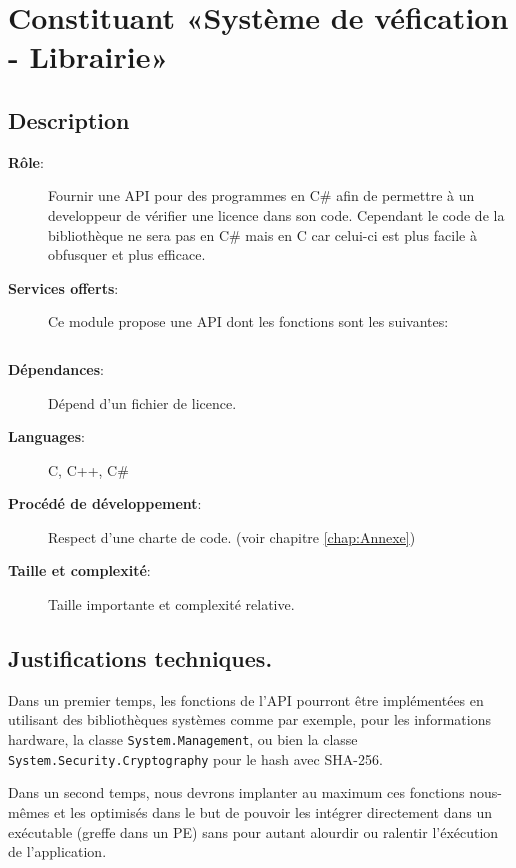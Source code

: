 \section{Constituant «Système de véfication - Librairie»}
\subsection{Description}
\begin{description}
	\item[\textbf{Rôle}:]
		Fournir une API pour des programmes en C\# afin de 
		permettre à un developpeur de vérifier une licence dans son code.
        Cependant le code de la bibliothèque ne sera pas en C\# mais en 
        C car celui-ci est plus facile à obfusquer et plus efficace. 

	\newpage

	\item[\textbf{Services offerts}:]
		Ce module propose une API dont les fonctions sont les suivantes:
        \inputminted{csharp}{lib.cs}
	\item[\textbf{Dépendances}:]
		Dépend d'un fichier de licence.	
	\item[\textbf{Languages}:]
		C, C++, C\#
	\item[\textbf{Procédé de développement}:]
		Respect d'une charte de code. (voir chapitre \ref{chap:Annexe})
	\item[\textbf{Taille et complexité}:]
		Taille importante et complexité relative.
\end{description}

\subsection{Justifications techniques.}
Dans un premier temps, les fonctions de l'API pourront être implémentées en utilisant des bibliothèques systèmes comme par exemple, pour les informations hardware, la classe \verb:System.Management:, ou bien la classe \verb:System.Security.Cryptography: pour le hash avec SHA-256.\newline

Dans un second temps, nous devrons implanter au maximum ces fonctions nous-mêmes et 
les optimisés dans le but de pouvoir les intégrer directement dans un 
exécutable (greffe dans un PE) sans pour autant alourdir ou ralentir l'éxécution de 
l'application. \newline

